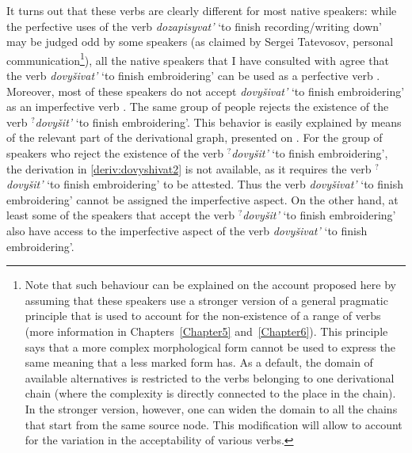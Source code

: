 It turns out that these verbs are clearly different for most native speakers: while the perfective uses of the verb \textit{dozapisyvat'} `to finish recording/writing down' may be judged odd by some speakers (as claimed by Sergei Tatevosov, personal communication\footnote{Note that such behaviour can be explained on the account proposed here by assuming that these speakers use a stronger version of a general pragmatic principle that is used to account for the non-existence of a range of verbs (more information in Chapters~\ref{Chapter5} and~\ref{Chapter6}). This principle says that a more complex morphological form cannot be used to express the same meaning that a less marked form has. As a default, the domain of available alternatives is restricted to the verbs belonging to one derivational chain (where the complexity is directly connected to the place in the chain). In the stronger version, however, one can widen the domain to all the chains that start from the same source node. This modification will allow to account for the variation in the acceptability of various verbs.}), all the native speakers that I have consulted with agree that the verb \textit{dovy\v{s}ivat'} `to finish embroidering' can be used as a perfective verb . Moreover, most of these speakers do not accept \textit{dovy\v{s}ivat'} `to finish embroidering' as an imperfective verb . The same group of people rejects the existence of the verb $^?$\textit{dovy\v{s}it'}\textsuperscript{\PF} `to finish embroidering'. This behavior is easily explained by means of the relevant part of the derivational graph, presented on . For the group of speakers who reject the existence of the verb $^?$\textit{dovy\v{s}it'}\textsuperscript{\PF} `to finish embroidering', the derivation in \ref{deriv:dovyshivat2} is not available, as it requires the verb $^?$\textit{dovy\v{s}it'}\textsuperscript{\PF} `to finish embroidering' to be attested. Thus the verb \textit{dovy\v{s}ivat'} `to finish embroidering' cannot be assigned the imperfective aspect. On the other hand, at least some of the speakers that accept the verb $^?$\textit{dovy\v{s}it'}\textsuperscript{\PF} `to finish embroidering' also have access to the imperfective aspect of the verb \textit{dovy\v{s}ivat'} `to finish embroidering'.

